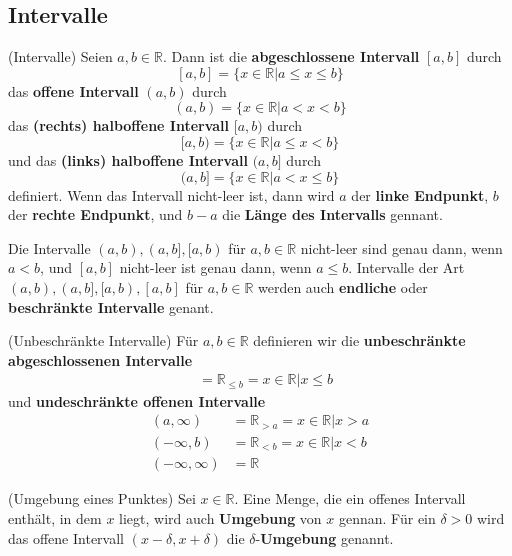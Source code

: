 \documentclass[../Analysis1_script.tex]{subfiles}
\begin{document}
\subsection{Intervalle}

\begin{definition}{(Intervalle)}
	Seien $a, b \in \mathbb{R}$. Dann ist die \textbf{abgeschlossene Intervall} $[a, b]$ durch
	\[ [a,b] = \{x \in \mathbb{R} | a \leq x \leq b\} \]
	das \textbf{offene Intervall} $(a, b)$ durch
	\[ (a,b) = \{x \in \mathbb{R} | a < x < b\} \]
	das \textbf{(rechts) halboffene Intervall} $[a, b)$ durch
	\[ [a,b) = \{x \in \mathbb{R} | a \leq x < b\} \]
	und das \textbf{(links) halboffene Intervall} $(a, b]$ durch
	\[ (a,b] = \{x \in \mathbb{R} | a < x \leq b\} \]
	definiert. Wenn das Intervall nicht-leer ist, dann wird $a$ der \textbf{linke Endpunkt}, $b$ der \textbf{rechte Endpunkt}, und $b - a$ die \textbf{Länge des Intervalls} gennant.
	
	Die Intervalle $(a, b), (a, b], [a, b)$ für $a, b \in \mathbb{R}$ nicht-leer sind genau dann, wenn $a < b$, und $[a, b]$ nicht-leer ist genau dann, wenn $a \leq b$. Intervalle der Art $(a, b), (a, b], [a, b), [a, b]$ für $a, b \in \mathbb{R}$ werden auch \textbf{endliche} oder \textbf{beschränkte Intervalle} genant.
\end{definition}

\begin{definition}{(Unbeschränkte Intervalle)}
	Für $a, b \in \mathbb{R}$ definieren wir die \textbf{unbeschränkte abgeschlossenen Intervalle}
	\begin{align*}
		[a, \infty) &= \mathbb{R}_{\geq a} = {x \in \mathbb{R} | x \geq a}\\
		(-\infty, b] &= \mathbb{R}_{\leq b} = {x \in \mathbb{R} | x \leq b}
	\end{align*}
	und \textbf{undeschränkte offenen Intervalle}
	\begin{align*}
		(a, \infty) &= \mathbb{R}_{> a} = {x \in \mathbb{R} | x > a}\\
		(-\infty, b) &= \mathbb{R}_{< b} = {x \in \mathbb{R} | x < b}\\
		(-\infty, \infty) &= \mathbb{R}
	\end{align*}
\end{definition}

\begin{definition}{(Umgebung eines Punktes)}
	Sei $x \in \mathbb{R}$. Eine Menge, die ein offenes Intervall enthält, in dem $x$ liegt, wird auch \textbf{Umgebung} von $x$ gennan. Für ein $\delta > 0$ wird das offene Intervall $(x - \delta, x + \delta)$ die $\delta$-\textbf{Umgebung} genannt.
\end{definition}
\end{document}
